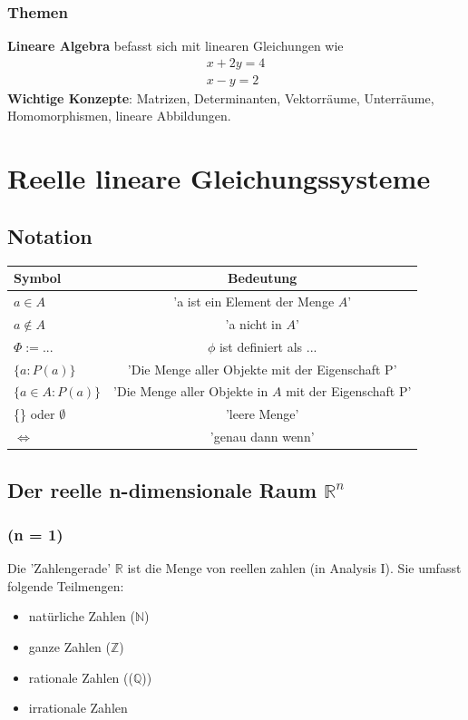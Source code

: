 \documentclass[11pt]{report}
\newcommand*\Zb[1] {\mathbb{#1}}
\begin{document}
\subsection{Themen}
\textbf{Lineare Algebra} befasst sich mit linearen Gleichungen wie
\begin{align}
x + 2y = 4\\
x - y = 2
\end{align}
\textbf{Wichtige Konzepte}: Matrizen, Determinanten, Vektorräume, Unterräume, Homomorphismen, lineare Abbildungen.

\chapter{Reelle lineare Gleichungssysteme}
\section*{Notation}
\begin{tabular}[ht]{|l|c|}
\hline
Symbol & Bedeutung\\
\hline
$a \in A$ & 'a ist ein Element der Menge $A$'\\
$a \notin A$ & 'a nicht in $A$'\\
$\Phi := ...$ & $\phi$ ist definiert als ...\\
$\{a : P(a)\}$ & 'Die Menge aller Objekte mit der Eigenschaft P'\\
$\{a\in A : P(a)\}$ & 'Die Menge aller Objekte in $A$ mit der Eigenschaft P'\\
\{\} oder $\emptyset$ & 'leere Menge' \\
$\Leftrightarrow$ & 'genau dann wenn' \\
\hline
\end{tabular}

\section{Der reelle n-dimensionale Raum $\Zb{R}^n$}
\subsection{(n = 1)}
Die 'Zahlengerade' $\Zb{R}$ ist die Menge von reellen zahlen (in Analysis I).
Sie umfasst folgende Teilmengen:
\begin{itemize}
\item natürliche Zahlen ($\mathbb{N}$)
\item ganze Zahlen ($\mathbb{Z}$)
\item rationale Zahlen (($\mathbb{Q}$))
\item irrationale Zahlen
\end{itemize}
      
\end{document}
